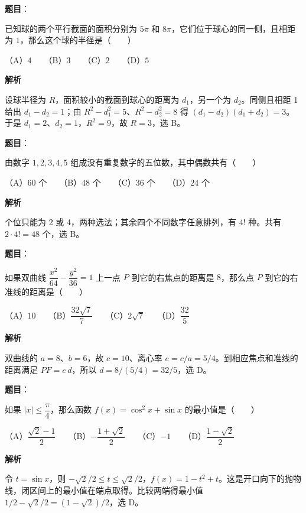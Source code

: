 \begin{answer}

\textbf{题目}：

已知球的两个平行截面的面积分别为 $5\pi$ 和 $8\pi$，它们位于球心的同一侧，且相距为 $1$，那么这个球的半径是\mbox{（　　）}

（A）$4$　　（B）$3$　　（C）$2$　　（D）$5$

\textbf{解析}

设球半径为 $R$，面积较小的截面到球心的距离为 $d_1$，另一个为 $d_2$。同侧且相距 1 给出 $d_1-d_2=1$；由 $R^2-d_1^2=5$、$R^2-d_2^2=8$ 得 $(d_1-d_2)(d_1+d_2)=3$。于是 $d_1=2$、$d_2=1$，$R^2=9$，故 $R=3$，选 B。


\end{answer}
\begin{answer}

\textbf{题目}：

由数字 $1,2,3,4,5$ 组成没有重复数字的五位数，其中偶数共有\mbox{（　　）}

（A）$60$ 个　　（B）$48$ 个　　（C）$36$ 个　　（D）$24$ 个

\textbf{解析}

个位只能为 2 或 4，两种选法；其余四个不同数字任意排列，有 $4!$ 种。共有 $2\cdot4!=48$ 个，选 B。


\end{answer}
\begin{answer}

\textbf{题目}：

如果双曲线 $\dfrac{x^2}{64}-\dfrac{y^2}{36}=1$ 上一点 $P$ 到它的右焦点的距离是 $8$，那么点 $P$ 到它的右准线的距离是\mbox{（　　）}

（A）$10$　　（B）$\dfrac{32\sqrt7}{7}$　　（C）$2\sqrt7$　　（D）$\dfrac{32}{5}$

\textbf{解析}

双曲线的 $a=8$、$b=6$，故 $c=10$、离心率 $e=c/a=5/4$。到相应焦点和准线的距离满足 $PF=e\,d$，所以 $d=8/(5/4)=32/5$，选 D。


\end{answer}
\begin{answer}

\textbf{题目}：

如果 $|x|\le\dfrac\pi4$，那么函数 $f(x)=\cos^2x+\sin x$ 的最小值是\mbox{（　　）}

（A）$\dfrac{\sqrt2-1}{2}$　　（B）$-\dfrac{1+\sqrt2}{2}$　　（C）$-1$　　（D）$\dfrac{1-\sqrt2}{2}$

\textbf{解析}

令 $t=\sin x$，则 $-\sqrt2/2\le t\le\sqrt2/2$，$f(x)=1-t^2+t$。这是开口向下的抛物线，闭区间上的最小值在端点取得。比较两端得最小值 $1/2-\sqrt2/2=(1-\sqrt2)/2$，选 D。


\end{answer}
